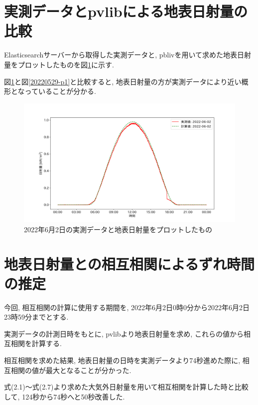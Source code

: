 \section{実測データとpvlibによる地表日射量の比較}
Elasticsearchサーバーから取得した実測データと, pblivを用いて求めた地表日射量をプロットしたものを図\ref{2-p1}に示す.

図\ref{2-p1}と図\ref{20220529-p1}と比較すると, 地表日射量の方が実測データにより近い概形となっていることが分かる.

\begin{figure}[h]
  \begin{center}
    \includegraphics[width=160mm]{sotu/figure/2/pvlib-20220602-corr.png}
    \caption{2022年6月2日の実測データと地表日射量をプロットしたもの}
    \label{2-p1}
  \end{center}
\end{figure}

\section{地表日射量との相互相関によるずれ時間の推定}
今回, 相互相関の計算に使用する期間を, 2022年6月2日0時0分から2022年6月2日23時59分までとする.

実測データの計測日時をもとに, pvlibより地表日射量を求め, これらの値から相互相関を計算する.

相互相関を求めた結果, 地表日射量の日時を実測データより74秒進めた際に, 相互相関の値が最大となることが分かった.

式(2.1)～式(2.7)より求めた大気外日射量を用いて相互相関を計算した時と比較して, 124秒から74秒へと50秒改善した.

